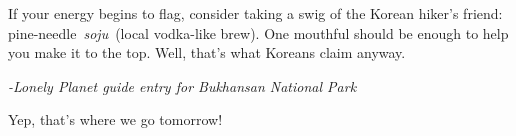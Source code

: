 \begin{post}
	\begin{content}

\begin{blockquote}If your energy begins to flag, consider taking a swig of the Korean hiker’s friend: pine-needle \textit{soju} (local vodka-like brew). One mouthful should be enough to help you make it to the top. Well, that’s what Koreans claim anyway.\end{blockquote}
\begin{flushright}
\textit{-Lonely Planet guide entry for Bukhansan National Park}
\end{flushright}

Yep, that's where we go tomorrow!
	\end{content}
\end{post}
